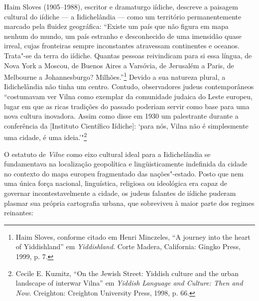 Haim Sloves (1905--1988), escritor e dramaturgo iídiche, descreve a
paisagem cultural do iídiche --- a Iidichelândia --- como um território
permanentemente marcado pela fluidez geográfica: ``Existe um país que
não figura em mapa nenhum do mundo, um país estranho e desconhecido de
uma imensidão quase irreal, cujas fronteiras sempre inconstantes
atravessam continentes e oceanos. Trata"-se da terra do iídiche. Quantas
pessoas reivindicam para si essa língua, de Nova York a Moscou, de
Buenos Aires a Varsóvia, de Jerusalém a Paris, de Melbourne a
Johannesburgo? Milhões.''\footnote{Haim Sloves, conforme citado em Henri Minczeles, ``A journey into the heart of Yiddishland'' em \textit{Yiddishland}. Corte Madera, California: Gingko Press, 1999, p. 7.} Devido a sua natureza plural, a Iidichelândia não tinha um centro. Contudo, observadores
judeus contemporâneos ``costumavam ver Vilna como exemplar da comunidade
judaica do Leste europeu, lugar em que as ricas tradições do passado
poderiam servir como base para uma nova cultura inovadora. Assim como
disse em 1930 um palestrante durante a conferência da  {[}Instituto
Científico Iídiche{]}: `para nós, Vilna não é simplesmente uma cidade, é
uma ideia.'"\footnote{Cecile E. Kuznitz, ``On the Jewish Street: Yiddish culture and the urban landscape of interwar Vilna'' em \textit{Yiddish Language and Culture: Then and Now}. Creighton: Creighton University Press, 1998, p. 66.}

O estatuto de \textit{Vilne} como eixo cultural ideal para a Iidichelândia se
fundamentava na localização geopolítica e lingüisticamente indefinida da
cidade no contexto do mapa europeu fragmentado das nações"-estado. Posto
que nem uma única força nacional, linguística, religiosa ou ideológica
era capaz de governar incontestavelmente a cidade, os judeus falantes de
iídiche puderam plasmar sua própria cartografia urbana, que sobreviveu à
maior parte dos regimes reinantes:

